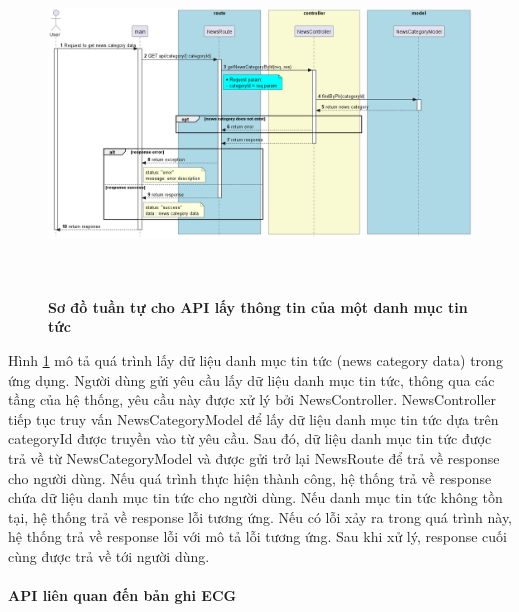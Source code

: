 \begin{figure}[H]
  \centering
  \includegraphics[width=16cm,height=9cm]{Images/server/sequence/server/getNewsCategoryById.png}
  \caption[Sơ đồ tuần tự cho API lấy thông tin của một danh mục tin tức ]{\bfseries \fontsize{12pt}{0pt}
  \selectfont Sơ đồ tuần tự cho API lấy thông tin của một danh mục tin tức }
  \label{getNewsCategoryById} %
\end{figure}
Hình \ref{getNewsCategoryById} mô tả quá trình lấy dữ liệu danh mục tin tức (news category data) trong ứng dụng. Người dùng gửi yêu cầu lấy dữ liệu danh mục tin tức, thông qua các tầng của hệ thống, yêu cầu này được xử lý bởi NewsController. NewsController tiếp tục truy vấn NewsCategoryModel để lấy dữ liệu danh mục tin tức dựa trên categoryId được truyền vào từ yêu cầu. Sau đó, dữ liệu danh mục tin tức được trả về từ NewsCategoryModel và được gửi trở lại NewsRoute để trả về response cho người dùng. Nếu quá trình thực hiện thành công, hệ thống trả về response chứa dữ liệu danh mục tin tức cho người dùng. Nếu danh mục tin tức không tồn tại, hệ thống trả về response lỗi tương ứng. Nếu có lỗi xảy ra trong quá trình này, hệ thống trả về response lỗi với mô tả lỗi tương ứng. Sau khi xử lý, response cuối cùng được trả về tới người dùng.



\paragraph{API liên quan đến bản ghi ECG}
\mbox{}

